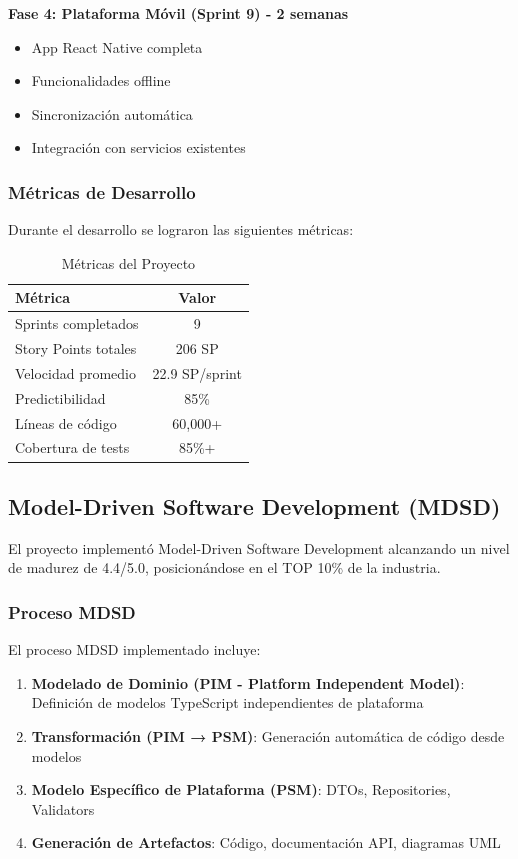 \documentclass[12pt,a4paper]{article}
\begin{document}
\textbf{Fase 4: Plataforma Móvil (Sprint 9) - 2 semanas}
\begin{itemize}
    \item App React Native completa
    \item Funcionalidades offline
    \item Sincronización automática
    \item Integración con servicios existentes
\end{itemize}

\subsubsection{Métricas de Desarrollo}

Durante el desarrollo se lograron las siguientes métricas:

\begin{table}[H]
\centering
\caption{Métricas del Proyecto}
\begin{tabular}{|l|c|}
\hline
\textbf{Métrica} & \textbf{Valor} \\
\hline
Sprints completados & 9 \\
\hline
Story Points totales & 206 SP \\
\hline
Velocidad promedio & 22.9 SP/sprint \\
\hline
Predictibilidad & 85\% \\
\hline
Líneas de código & 60,000+ \\
\hline
Cobertura de tests & 85\%+ \\
\hline
\end{tabular}
\end{table}

\subsection{Model-Driven Software Development (MDSD)}

El proyecto implementó Model-Driven Software Development alcanzando un nivel de madurez de 4.4/5.0, posicionándose en el TOP 10\% de la industria.

\subsubsection{Proceso MDSD}

El proceso MDSD implementado incluye:

\begin{enumerate}
    \item \textbf{Modelado de Dominio (PIM - Platform Independent Model)}: Definición de modelos TypeScript independientes de plataforma
    \item \textbf{Transformación (PIM → PSM)}: Generación automática de código desde modelos
    \item \textbf{Modelo Específico de Plataforma (PSM)}: DTOs, Repositories, Validators
    \item \textbf{Generación de Artefactos}: Código, documentación API, diagramas UML
\end{enumerate}
\end{document}
